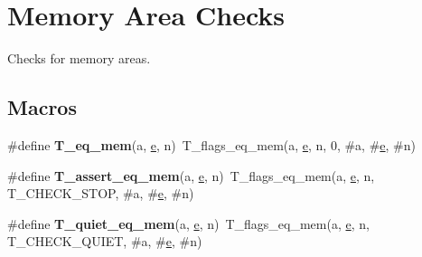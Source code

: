 \hypertarget{group__RTEMSTestFrameworkChecksMemStr}{}\section{Memory Area Checks}
\label{group__RTEMSTestFrameworkChecksMemStr}


Checks for memory areas.  


\subsection*{Macros}
\begin{DoxyCompactItemize}
\item 
\mbox{\label{group__RTEMSTestFrameworkChecksMemStr_gaf9b8576b912540e6394c5b2b77d08fdd}} 
\#define {\bfseries T\+\_\+eq\+\_\+mem}(a,  \mbox{\hyperlink{sun4u_2tte_8h_a8b0b9ed08e0e18920ec2682f48228c27}{e}},  n)~T\+\_\+flags\+\_\+eq\+\_\+mem(a, \mbox{\hyperlink{sun4u_2tte_8h_a8b0b9ed08e0e18920ec2682f48228c27}{e}}, n, 0, \#a, \#\mbox{\hyperlink{sun4u_2tte_8h_a8b0b9ed08e0e18920ec2682f48228c27}{e}}, \#n)
\item 
\mbox{\label{group__RTEMSTestFrameworkChecksMemStr_ga362f6a64a8b04e2c673c818b4769d7b2}} 
\#define {\bfseries T\+\_\+assert\+\_\+eq\+\_\+mem}(a,  \mbox{\hyperlink{sun4u_2tte_8h_a8b0b9ed08e0e18920ec2682f48228c27}{e}},  n)~T\+\_\+flags\+\_\+eq\+\_\+mem(a, \mbox{\hyperlink{sun4u_2tte_8h_a8b0b9ed08e0e18920ec2682f48228c27}{e}}, n, T\+\_\+\+C\+H\+E\+C\+K\+\_\+\+S\+T\+OP, \#a, \#\mbox{\hyperlink{sun4u_2tte_8h_a8b0b9ed08e0e18920ec2682f48228c27}{e}}, \#n)
\item 
\mbox{\label{group__RTEMSTestFrameworkChecksMemStr_ga872fb18b6c487f8c1957eb6093d69f47}} 
\#define {\bfseries T\+\_\+quiet\+\_\+eq\+\_\+mem}(a,  \mbox{\hyperlink{sun4u_2tte_8h_a8b0b9ed08e0e18920ec2682f48228c27}{e}},  n)~T\+\_\+flags\+\_\+eq\+\_\+mem(a, \mbox{\hyperlink{sun4u_2tte_8h_a8b0b9ed08e0e18920ec2682f48228c27}{e}}, n, T\+\_\+\+C\+H\+E\+C\+K\+\_\+\+Q\+U\+I\+ET, \#a, \#\mbox{\hyperlink{sun4u_2tte_8h_a8b0b9ed08e0e18920ec2682f48228c27}{e}}, \#n)
\item 
\mbox{\label{group__RTEMSTestFrameworkChecksMemStr_ga13a9a686558e94ab822a751e4c9f546a}} 

\end{DoxyCompactItemize}
